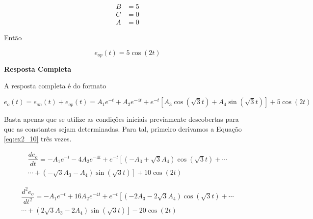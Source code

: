 \documentclass{article}
\numberwithin{equation}{section}
\newcommand{\deo}[1]{\dfrac{d^{#1}e_o}{dt^{#1}}}
\let\dfr\dfrac
\begin{document}
\begin{equation*}
    \begin{split}
        B &= 5\\
        C &= 0\\
        A &= 0
    \end{split}
\end{equation*}

\noindent Então

\begin{equation*}
    e_{op}(t) = 5\cos(2t)
\end{equation*}

\begin{center}
    \textbf{Resposta Completa}
\end{center}

\noindent A resposta completa é do formato

\begin{equation}
    \label{eq:ex2_10}
    e_{o}(t) = e_{on}(t) + e_{op}(t) = A_1e^{-t} + A_2e^{-4t} + e^{-t}\left[A_3\cos\left(\sqrt{3}t\right)+A_4\sin\left(\sqrt{3}t\right)\right] + 5\cos\left(2t\right)
\end{equation}

\noindent Basta apenas que se utilize as condições iniciais previamente descobertas para que as constantes sejam determinadas. Para tal, primeiro derivamos a Equação \eqref{eq:ex2_10} três vezes.

\begin{equation}
    \begin{split}
        \label{eq:ex2_11}
        \dfr{de_o}{dt} = -A_1e^{-t} -4A_2e^{-4t} + e^{-t}\left[\left(-A_3+\sqrt{3}A_4\right)\cos\left(\sqrt{3}t\right)+\right.\cdots\\
        \left.\cdots+\left(-\sqrt{3}A_3-A_4\right)\sin\left(\sqrt{3}t\right)\right] +10\cos\left(2t\right)
    \end{split}
\end{equation}

\begin{equation}
    \begin{split}
        \label{eq:ex2_12}
        \deo{2} = -A_1e^{-t} +16A_2e^{-4t} + e^{-t}\left[\left(-2A_3-2\sqrt{3}A_4\right)\cos\left(\sqrt{3}t\right)+\right.\cdots\\
        \left.\cdots+\left(2\sqrt{3}A_3-2A_4\right)\sin\left(\sqrt{3}t\right)\right]-20\cos\left(2t\right)
    \end{split}
\end{equation}
\end{document}
